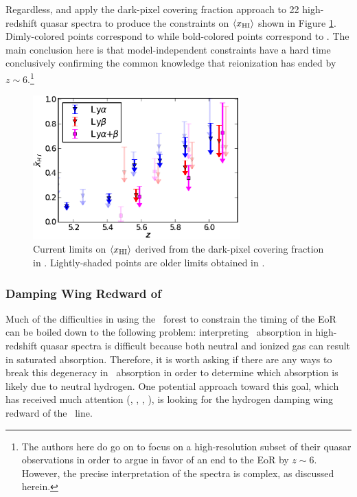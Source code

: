 Regardless, \cite{McGreer:2011dm} and \cite{McGreer:2014qwa} apply the dark-pixel covering fraction approach to 22 high-redshift quasar spectra to produce the constraints on $\langle x_{\text{HI}}\rangle$ shown in Figure \ref{fig:McGreer}. Dimly-colored points correspond to \cite{McGreer:2011dm} while bold-colored points correspond to \cite{McGreer:2014qwa}. The main conclusion here is that model-independent constraints have a hard time conclusively confirming the common knowledge that reionization has ended by $z \sim 6$.\footnote{The authors here do go on to focus on a high-resolution subset of their quasar observations in order to argue in favor of an end to the EoR by $z \sim 6$. However, the precise interpretation of the spectra is complex, as discussed herein.} 

\begin{figure}[h]
  \centering
  \includegraphics[width=8cm]{xhi_newdata.eps}
  \caption{Current limits on $\langle x_{\text{HI}}\rangle$ derived from the dark-pixel covering fraction in \cite{McGreer:2014qwa}. Lightly-shaded points are older limits obtained in \cite{McGreer:2011dm}.}
  \label{fig:McGreer}
\end{figure}



\subsubsection{Damping Wing Redward of \lya}\label{sec:IntroDampingWing}

Much of the difficulties in using the \lya\ forest to constrain the timing of the EoR can be boiled down to the following problem: interpreting \lya\ absorption in high-redshift quasar spectra is difficult because both neutral and ionized gas can result in saturated absorption. Therefore, it is worth asking if there are any ways to break this degeneracy in \lya\ absorption in order to determine which absorption is likely due to neutral hydrogen. One potential approach toward this goal, which has received much attention (\cite{Chornock:2013una}, \cite{Chornock:2014fva}, \cite{Mortlock2011}, \cite{Bolton:2011vb}), is looking for the hydrogen damping wing redward of the \lya\ line. 


